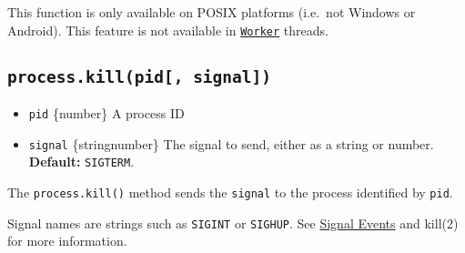 \begin{Shaded}
\begin{Highlighting}[]
\OperatorTok{,}\OperatorTok{,}\OperatorTok{=} \NormalTok{(}\NormalTok{)}\OperatorTok{;}

\NormalTok{(}\NormalTok{())}\OperatorTok{;}         \CommentTok{// [ 0 ]}
\NormalTok{(}\OperatorTok{,} \NormalTok{)}\OperatorTok{;}     
\NormalTok{(}\NormalTok{())}\OperatorTok{;}         \CommentTok{// [ 27, 30, 46, 1000, 0 ]}
\NormalTok{(}\NormalTok{)}\OperatorTok{;}                     
\NormalTok{(}\NormalTok{())}\OperatorTok{;}         \CommentTok{// [ 27, 30, 46, 1000 ]}
\end{Highlighting}
\end{Shaded}

This function is only available on POSIX platforms (i.e.~not Windows or
Android). This feature is not available in
\href{worker_threads.md\#class-worker}{\texttt{Worker}} threads.

\subsection{\texorpdfstring{\texttt{process.kill(pid{[},\ signal{]})}}{process.kill(pid{[}, signal{]})}}\label{process.killpid-signal}

\begin{itemize}
\tightlist
\item
  \texttt{pid} \{number\} A process ID
\item
  \texttt{signal} \{string\textbar number\} The signal to send, either
  as a string or number. \textbf{Default:}
  \texttt{\textquotesingle{}SIGTERM\textquotesingle{}}.
\end{itemize}

The \texttt{process.kill()} method sends the \texttt{signal} to the
process identified by \texttt{pid}.

Signal names are strings such as
\texttt{\textquotesingle{}SIGINT\textquotesingle{}} or
\texttt{\textquotesingle{}SIGHUP\textquotesingle{}}. See
\hyperref[signal-events]{Signal Events} and kill(2) for more
information.

